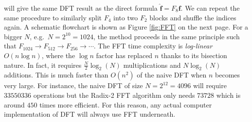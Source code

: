 will give the same DFT result as the direct formula $\hat{\textbf{f}} = F_8\textbf{f}$. We can repeat the same procedure to similarly split $F_4$ into two $F_2$ blocks and shuffle the indices again. A schematic flowchart is shown as Figure \ref{fig:FFT} on the next page. For a bigger $N$, e.g.\ $N = 2^{10} = 1024$, the method proceeds in the same principle such that $F_{1024} \to F_{512} \to F_{256} \to \cdots$. The FFT time complexity is \textit{log-linear} $O(n \log n)$, where the $\log n$ factor has replaced $n$ thanks to its bisection nature. In fact, it requires $\frac{N}{2}\log_2(N)$ multiplications and $N\log_2(N)$ additions. This is much faster than $O(n^2)$ of the naive DFT when $n$ becomes very large. For instance, the naive DFT of size $N = 2^{12} = 4096$ will require $33550336$ operations but the Radix-2 FFT algorithm only needs $73728$ which is around $450$ times more efficient. For this reason, any actual computer implementation of DFT will always use FFT underneath.

